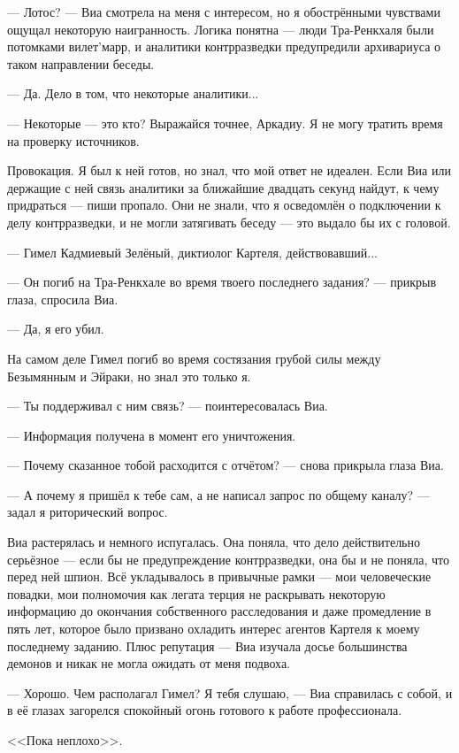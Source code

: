 --- Лотос? --- Виа смотрела на меня с интересом, но я обострёнными чувствами ощущал некоторую наигранность.
Логика понятна --- люди Тра-Ренкхаля были потомками вилет'марр, и аналитики контрразведки предупредили архивариуса о таком направлении беседы.

--- Да.
Дело в том, что некоторые аналитики...

--- Некоторые --- это кто?
Выражайся точнее, Аркадиу.
Я не могу тратить время на проверку источников.

Провокация.
Я был к ней готов, но знал, что мой ответ не идеален.
Если Виа или держащие с ней связь аналитики за ближайшие двадцать секунд найдут, к чему придраться --- пиши пропало.
Они не знали, что я осведомлён о подключении к делу контрразведки, и не могли затягивать беседу --- это выдало бы их с головой.

--- Гимел Кадмиевый Зелёный, диктиолог Картеля, действовавший...

--- Он погиб на Тра-Ренкхале во время твоего последнего задания? --- прикрыв глаза, спросила Виа.

--- Да, я его убил.

На самом деле Гимел погиб во время состязания грубой силы между Безымянным и Эйраки, но знал это только я.

--- Ты поддерживал с ним связь? --- поинтересовалась Виа.

--- Информация получена в момент его уничтожения.

--- Почему сказанное тобой расходится с отчётом? --- снова прикрыла глаза Виа.

--- А почему я пришёл к тебе сам, а не написал запрос по общему каналу? --- задал я риторический вопрос.

Виа растерялась и немного испугалась.
Она поняла, что дело действительно серьёзное --- если бы не предупреждение контрразведки, она бы и не поняла, что перед ней шпион.
Всё укладывалось в привычные рамки --- мои человеческие повадки, мои полномочия как легата терция не раскрывать некоторую информацию до окончания собственного расследования и даже промедление в пять лет, которое было призвано охладить интерес агентов Картеля к моему последнему заданию.
Плюс репутация --- Виа изучала досье большинства демонов и никак не могла ожидать от меня подвоха.

--- Хорошо.
Чем располагал Гимел?
Я тебя слушаю, --- Виа справилась с собой, и в её глазах загорелся спокойный огонь готового к работе профессионала.

<<Пока неплохо>>.

